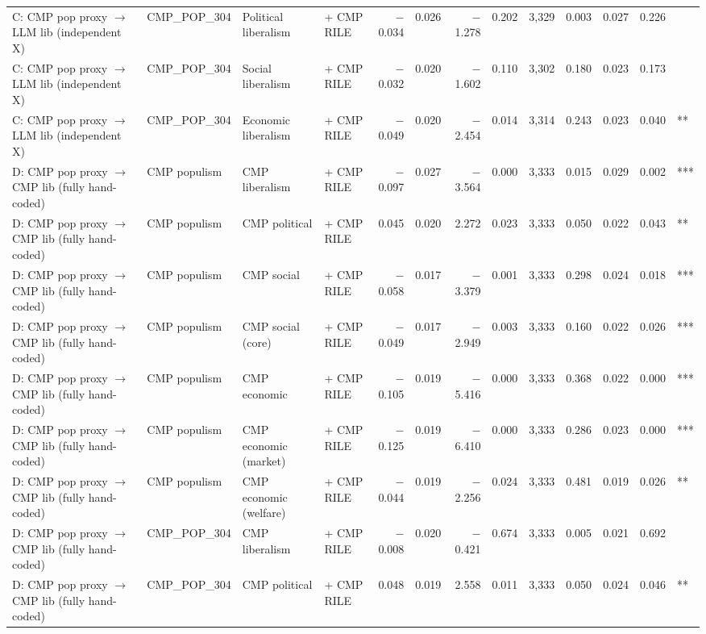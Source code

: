 \begin{table}[ht]
{\begin{tabular}{llllrrrrrrrrl}
C: CMP pop proxy $\rightarrow$ LLM lib (independent X) & CMP\_POP\_304 & Political liberalism & + CMP RILE & $-$0.034 & 0.026 & $-$1.278 & 0.202 & 3,329 & 0.003 & 0.027 & 0.226 &  \\
C: CMP pop proxy $\rightarrow$ LLM lib (independent X) & CMP\_POP\_304 & Social liberalism & + CMP RILE & $-$0.032 & 0.020 & $-$1.602 & 0.110 & 3,302 & 0.180 & 0.023 & 0.173 &  \\
C: CMP pop proxy $\rightarrow$ LLM lib (independent X) & CMP\_POP\_304 & Economic liberalism & + CMP RILE & $-$0.049 & 0.020 & $-$2.454 & 0.014 & 3,314 & 0.243 & 0.023 & 0.040 & ** \\
D: CMP pop proxy $\rightarrow$ CMP lib (fully hand-coded) & CMP populism & CMP liberalism & + CMP RILE & $-$0.097 & 0.027 & $-$3.564 & 0.000 & 3,333 & 0.015 & 0.029 & 0.002 & *** \\
D: CMP pop proxy $\rightarrow$ CMP lib (fully hand-coded) & CMP populism & CMP political & + CMP RILE & 0.045 & 0.020 & 2.272 & 0.023 & 3,333 & 0.050 & 0.022 & 0.043 & ** \\
D: CMP pop proxy $\rightarrow$ CMP lib (fully hand-coded) & CMP populism & CMP social & + CMP RILE & $-$0.058 & 0.017 & $-$3.379 & 0.001 & 3,333 & 0.298 & 0.024 & 0.018 & *** \\
D: CMP pop proxy $\rightarrow$ CMP lib (fully hand-coded) & CMP populism & CMP social (core) & + CMP RILE & $-$0.049 & 0.017 & $-$2.949 & 0.003 & 3,333 & 0.160 & 0.022 & 0.026 & *** \\
D: CMP pop proxy $\rightarrow$ CMP lib (fully hand-coded) & CMP populism & CMP economic & + CMP RILE & $-$0.105 & 0.019 & $-$5.416 & 0.000 & 3,333 & 0.368 & 0.022 & 0.000 & *** \\
D: CMP pop proxy $\rightarrow$ CMP lib (fully hand-coded) & CMP populism & CMP economic (market) & + CMP RILE & $-$0.125 & 0.019 & $-$6.410 & 0.000 & 3,333 & 0.286 & 0.023 & 0.000 & *** \\
D: CMP pop proxy $\rightarrow$ CMP lib (fully hand-coded) & CMP populism & CMP economic (welfare) & + CMP RILE & $-$0.044 & 0.019 & $-$2.256 & 0.024 & 3,333 & 0.481 & 0.019 & 0.026 & ** \\
D: CMP pop proxy $\rightarrow$ CMP lib (fully hand-coded) & CMP\_POP\_304 & CMP liberalism & + CMP RILE & $-$0.008 & 0.020 & $-$0.421 & 0.674 & 3,333 & 0.005 & 0.021 & 0.692 &  \\
D: CMP pop proxy $\rightarrow$ CMP lib (fully hand-coded) & CMP\_POP\_304 & CMP political & + CMP RILE & 0.048 & 0.019 & 2.558 & 0.011 & 3,333 & 0.050 & 0.024 & 0.046 & ** \\

\end{tabular}}
\end{table}
